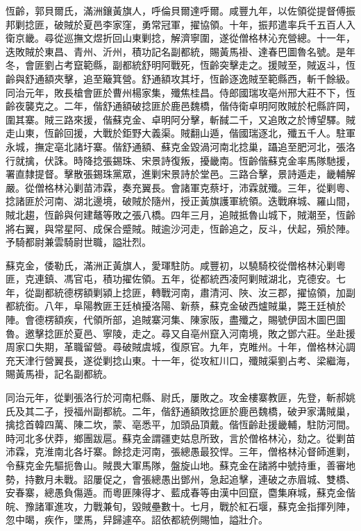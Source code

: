 \begin{pinyinscope}
恆齡，郭貝爾氏，滿洲鑲黃旗人，呼倫貝爾達呼爾。咸豐九年，以佐領從提督傅振邦剿捻匪，破賊於夏邑李家窪，勇常冠軍，擢協領。十年，振邦遣率兵千五百人入衛京畿。尋從巡撫文煜折回山東剿捻，解濟寧圍，遂從僧格林沁充營總。十一年，迭敗賊於東昌、青州、沂州，積功記名副都統，賜黃馬褂、達春巴圖魯名號。是年冬，會匪劉占考竄範縣，副都統舒明阿戰死，恆齡突擊走之。援賊至，賊返斗，恆齡與舒通額夾擊，追至簸箕營。舒通額攻其圩，恆齡逐逸賊至範縣西，斬千餘級。同治元年，敗長槍會匪於曹州楊家集，殲焦桂昌。侍郎國瑞攻亳州邢大莊不下，恆齡夜襲克之。二年，偕舒通額破捻匪於鹿邑魏橋，偕侍衛卓明阿敗賊於杞縣許岡，圍其寨。賊三路來援，偕蘇克金、卓明阿分擊，斬馘二千，又追敗之於博望驛。賊走山東，恆齡回援，大戰於鉅野大義渠。賊翻山遁，偕國瑞逐北，殲五千人。駐軍永城，撫定亳北諸圩寨。偕舒通額、蘇克金毀渦河南北捻巢，躡追至肥河北，張洛行就擒，伏誅。時降捻張錫珠、宋景詩復叛，擾畿南。恆齡偕蘇克金率馬隊馳援，署直隸提督。擊散張錫珠黨眾，進剿宋景詩於堂邑。三路合擊，景詩遁走，畿輔解嚴。從僧格林沁剿苗沛霖，奏充翼長。會諸軍克蔡圩，沛霖就殲。三年，從剿粵、捻諸匪於河南、湖北邊境，破賊於隨州，授正黃旗護軍統領。迭戰麻城、羅山間，賊北趨，恆齡與何建鼇等敗之張八橋。四年三月，追賊抵魯山城下，賊潮至，恆齡將右翼，與常星阿、成保合蹙賊。賊逾沙河走，恆齡追之，反斗，伏起，殞於陣。予騎都尉兼雲騎尉世職，謚壯烈。

蘇克金，倭勒氏，滿洲正黃旗人，愛琿駐防。咸豐初，以驍騎校從僧格林沁剿粵匪，克連鎮、馮官屯，積功擢佐領。五年，從都統西凌阿剿賊湖北，克德安。七年，從副都統德楞額剿潁上捻匪，轉戰河南，肅清河、陜、汝三郡，擢協領，加副都統銜。八年，阜陽教匪王廷楨擾洛陽、新蔡，蘇克金破西爐賊巢，斃王廷楨於陣。會德楞額疾，代領所部，追賊寨河集、陳家阪，盡殲之，賜號伊固木圖巴圖魯。邀擊捻匪於夏邑、寧陵，走之。尋又自亳州竄入河南境，敗之鄧六莊。坐赴援周家口失期，革職留營。尋破賊虞城，復原官。九年，克睢州。十年，僧格林沁調充天津行營翼長，遂從剿捻山東。十一年，從攻紅川口，殲賊渠劉占考、梁繼海，賜黃馬褂，記名副都統。

同治元年，從剿張洛行於河南杞縣、尉氏，屢敗之。攻金樓寨教匪，先登，斬郝姚氏及其二子，授福州副都統。二年，偕舒通額敗捻匪於鹿邑魏橋，破尹家溝賊巢，擒捻首韓四萬、陳二坎，蒙、亳悉平，加頭品頂戴。偕恆齡赴援畿輔，駐防河間。時河北多伏莽，鄉團跋扈。蘇克金謂疆吏姑息所致，言於僧格林沁，劾之。從剿苗沛霖，克淮南北各圩寨。餘捻走河南，張總愚最狡悍。三年，僧格林沁督師進剿，令蘇克金先驅扼魯山。賊畏大軍馬隊，盤旋山地。蘇克金在諸將中號持重，善審地勢，持數月未戰。詔屢促之，會張總愚出鄧州，急起追擊，連破之赤眉城、雙橋、安春寨，總愚負傷遁。而粵匪陳得才、藍成春等由漢中回竄，麕集麻城，蘇克金偕皖、豫諸軍進攻，力戰兼旬，毀賊壘數十。七月，戰於紅石堰，蘇克金指揮列陣，忽中暍，疾作，墜馬，舁歸遽卒。詔依都統例賜恤，謚壯介。


\end{pinyinscope}
